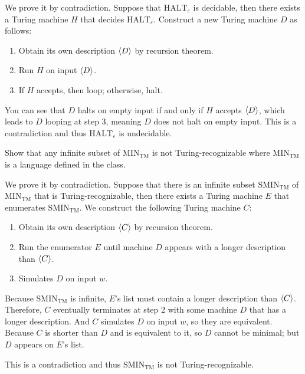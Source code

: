 \documentclass{homework}
\begin{document}
\begin{solution}

  We prove it by contradiction.
  Suppose that $\mathrm{HALT}_{\varepsilon}$ is decidable,
  then there exists a Turing machine $H$ that decides $\mathrm{HALT}_{\varepsilon}$.
  Construct a new Turing machine $D$ as follows:
  \begin{enumerate}
    \item Obtain its own description $\langle D \rangle$ by recursion theorem.
    \item Run $H$ on input $\langle D \rangle$.
    \item If $H$ accepts, then loop; otherwise, halt.
  \end{enumerate}

  You can see that $D$ halts on empty input
  if and only if $H$ accepts $\langle D \rangle$,
  which leads to $D$ looping at step 3,
  meaning $D$ does not halt on empty input.
  This is a contradiction and thus
  $\mathrm{HALT}_{\varepsilon}$ is undecidable.

\end{solution}

\begin{problem}
  Show that any infinite subset of $\mathrm{MIN}_{\text{TM}}$ is not
  Turing-recognizable where $\mathrm{MIN}_{\text{TM}}$ is a language defined in
  the class.
\end{problem}

\begin{solution}

  We prove it by contradiction.
  Suppose that there is an infinite subset
  $\mathrm{SMIN}_{\text{TM}}$ of $\mathrm{MIN}_{\text{TM}}$
  that is Turing-recognizable,
  then there exists a Turing machine $E$ that
  enumerates $\mathrm{SMIN}_{\text{TM}}$.
  We construct the following Turing machine $C$:
  \begin{enumerate}
    \item Obtain its own description $\langle C \rangle$ by recursion theorem.
    \item Run the enumerator $E$ until machine $D$ appears with
          a longer description than $\langle C \rangle$.
    \item Simulates $D$ on input $w$.
  \end{enumerate}

  Because $\mathrm{SMIN}_{\text{TM}}$ is infinite,
  $E$'s list must contain a longer description than $\langle C \rangle$.
  Therefore, $C$ eventually terminates at step 2
  with some machine $D$ that has a longer description.
  And $C$ simulates $D$ on input $w$, so they are equivalent.
  Because $C$ is shorter than $D$ and is equivalent to it,
  so $D$ cannot be minimal; but $D$ appears on $E$'s list.

  This is a contradiction and thus $\mathrm{SMIN}_{\text{TM}}$ is not Turing-recognizable.

\end{solution}
\end{document}
